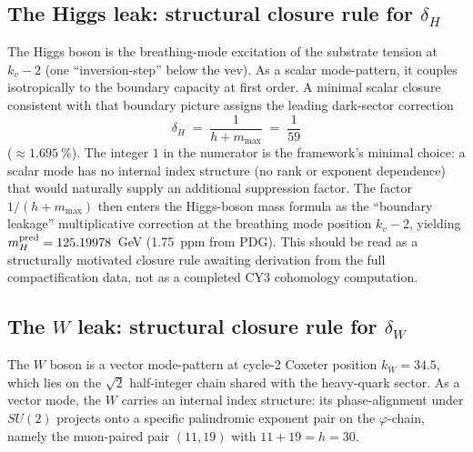 ﻿\documentclass[reprint,amsmath,amssymb,aps,prd,longbibliography,floatfix]{revtex4-2}
\begin{document}
\subsection{The Higgs leak: structural closure rule for $\delta_H$}

The Higgs boson is the breathing-mode excitation of the substrate
tension at $k_v - 2$ (one ``inversion-step'' below the vev). As a
scalar mode-pattern, it couples isotropically to the boundary capacity
at first order. A minimal scalar closure consistent with that boundary
picture assigns the leading dark-sector correction
\begin{equation}
\boxed{\delta_H \;=\; \frac{1}{h + m_{\max}} \;=\; \frac{1}{59}}
\label{eq:deltaH_derived}
\end{equation}
($\approx \SI{1.695}{\percent}$). The integer $1$ in the numerator is
the framework's minimal choice: a scalar mode has no internal index
structure (no rank or exponent dependence) that would naturally supply
an additional suppression factor. The factor $1/(h + m_{\max})$ then
enters the Higgs-boson mass formula as
the ``boundary leakage'' multiplicative correction at the breathing
mode position $k_v - 2$, yielding $m_H^{\rm pred} = 125.19978$~GeV
(\SI{1.75}{ppm} from PDG). This should be read as a structurally
motivated closure rule awaiting derivation from the full compactification
data, not as a completed CY3 cohomology computation.

\subsection{The $W$ leak: structural closure rule for $\delta_W$}

The $W$ boson is a vector mode-pattern at cycle-2 Coxeter position
$k_W = 34.5$, which lies on the $\sqrt{2}$ half-integer chain shared
with the heavy-quark sector. As a vector mode, the $W$ carries an
internal index structure: its phase-alignment under $SU(2)$ projects
onto a specific palindromic exponent pair on the $\varphi$-chain,
namely the muon-paired pair $(11, 19)$ with $11 + 19 = h = 30$.
\end{document}

